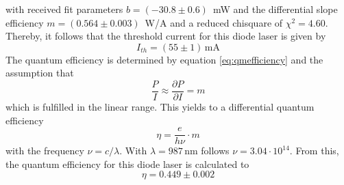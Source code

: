 \documentclass[10pt, a4paper, notitlepage, DIV=15]{scrartcl}
\begin{document}
with received fit parameters $b=\left( -30.8 \pm 0.6 \right)\,$ mW and the differential slope efficiency $m=\left( 0.564 \pm 0.003  \right)\, $ W/A and a reduced chisquare of $\chi^2=4.60$. Thereby, it follows that the threshold current for this diode laser is given by
\begin{equation}
I_{th}=\left( 55\pm 1\right)\,\text{mA}
\end{equation}
The quantum efficiency is determined by equation \ref{eq:qmefficiency} and the assumption that 
\begin{equation}
\frac{P}{I} \approx \frac{\partial P}{\partial I} = m
\end{equation}
which is fulfilled in the linear range.
This yields to a differential quantum efficiency
\begin{equation}
\eta = \frac{e}{h \nu} \cdot m
\end{equation}
with the frequency $\nu=c/\lambda$. With $\lambda=987\,$nm follows $\nu=3.04\cdot10^{14}$.
From this, the quantum efficiency for this diode laser is calculated to
\begin{equation}
\eta = 0.449 \pm 0.002
\end{equation}
\end{document}
